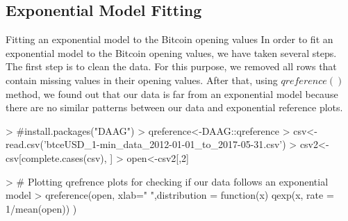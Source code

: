 \documentclass{article}
\begin{document}
\subsection{Exponential Model Fitting}
Fitting an exponential model to the Bitcoin opening values
In order to fit an exponential model to the Bitcoin opening values, we have taken several steps. The first step is to clean the data. For this purpose, we removed all rows that contain missing values in their opening values. After that, using $qreference()$ method, we found out that our data is far from an exponential model because there are no similar patterns between our data and exponential reference plots.
\begin{Schunk}
\begin{Sinput}
> #install.packages("DAAG")
> qreference<-DAAG::qreference
> csv<-read.csv('btceUSD_1-min_data_2012-01-01_to_2017-05-31.csv')
> csv2<-csv[complete.cases(csv), ]
> open<-csv2[,2]
\end{Sinput}
\end{Schunk}
\begin{Schunk}
\begin{Sinput}
> # Plotting qrefrence plots for checking if our data follows an exponential model
> qreference(open, xlab=" ",distribution = function(x) qexp(x, rate = 1/mean(open)) )
\end{Sinput}
\end{Schunk}
\end{document}
